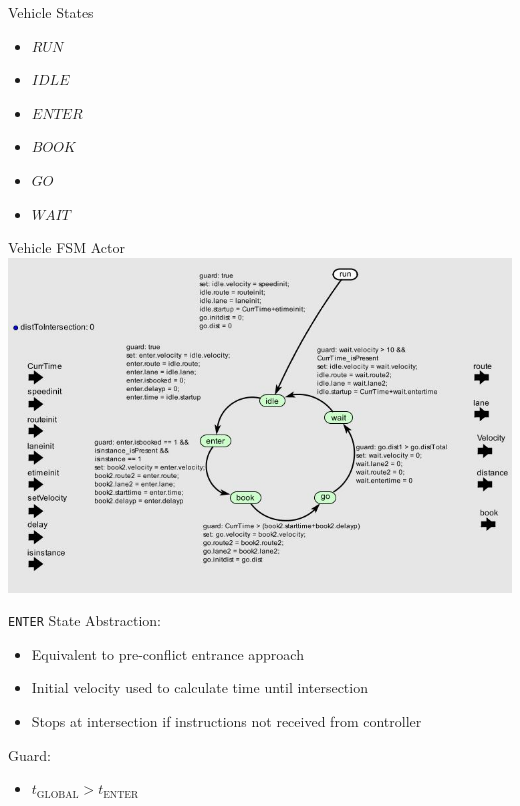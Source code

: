 \begin{frame}{Vehicle States}
\begin{itemize}
\item $RUN$
\item $IDLE$
\item $ENTER$
\item $BOOK$
\item $GO$
\item $WAIT$
\end{itemize}
\end{frame}

\begin{frame}{Vehicle FSM Actor}
\centering\includegraphics[width=0.9\linewidth]{diagram/ptolemy_vehicle_fsm.jpg}
\end{frame}

\begin{frame}{\texttt{ENTER} State}
Abstraction:
\begin{itemize}
\item Equivalent to pre-conflict entrance approach
\item Initial velocity used to calculate time until intersection
\item Stops at intersection if instructions not received from controller
\end{itemize}
Guard:
\begin{itemize}
\item $t_\text{GLOBAL} > t_\text{ENTER}$
\end{itemize}
\end{frame}

